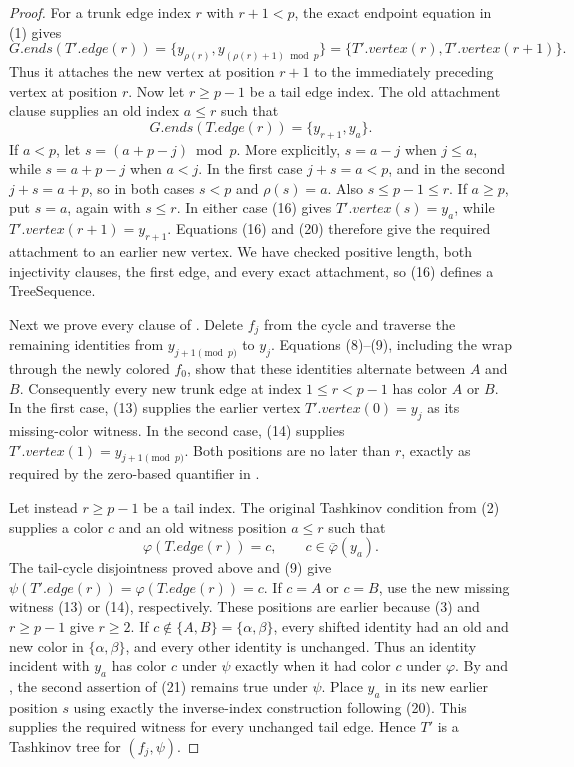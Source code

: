 \begin{proof}
For a trunk edge index $r$ with $r+1<p$, the exact endpoint equation in
(1) gives
\[
 G.ends(T'.edge(r))
   =\{y_{\rho(r)},y_{(\rho(r)+1)\bmod p}\}
   =\{T'.vertex(r),T'.vertex(r+1)\}.                             \tag{19}
\]
Thus it attaches the new vertex at position $r+1$ to the immediately
preceding vertex at position $r$.  Now let $r\geq p-1$ be a tail edge
index.  The old attachment clause supplies an old index $a\leq r$ such
that
\[
             G.ends(T.edge(r))=\{y_{r+1},y_a\}.                  \tag{20}
\]
If $a<p$, let $s=(a+p-j)\bmod p$.  More explicitly, $s=a-j$ when
$j\leq a$, while $s=a+p-j$ when $a<j$.  In the first case
$j+s=a<p$, and in the second $j+s=a+p$, so in both cases $s<p$ and
$\rho(s)=a$.  Also $s\leq p-1\leq r$.  If $a\geq p$, put $s=a$,
again with $s\leq r$.
In either case (16) gives $T'.vertex(s)=y_a$, while
$T'.vertex(r+1)=y_{r+1}$.  Equations (16) and (20) therefore give the
required attachment to an earlier new vertex.  We have checked positive
length, both injectivity clauses, the first edge, and every exact
attachment, so (16) defines a TreeSequence.

Next we prove every clause of .  Delete $f_j$ from
the cycle and traverse the remaining identities from $y_{j+1\pmod p}$
to $y_j$.  Equations (8)--(9), including the wrap through the newly
colored $f_0$, show that these identities alternate between $A$ and $B$.
Consequently every new trunk edge at index $1\leq r<p-1$ has color $A$
or $B$.  In the first case, (13) supplies the earlier vertex
$T'.vertex(0)=y_j$ as its missing-color witness.  In the second case,
(14) supplies $T'.vertex(1)=y_{j+1\pmod p}$.  Both positions are no later
than $r$, exactly as required by the zero-based quantifier in
.

Let instead $r\geq p-1$ be a tail index.  The original Tashkinov
condition from (2) supplies a color $c$ and an old witness position
$a\leq r$ such that
\[
       \varphi(T.edge(r))=c,\qquad c\in\overline\varphi(y_a).   \tag{21}
\]
The tail-cycle disjointness proved above and (9) give
$\psi(T'.edge(r))=\varphi(T.edge(r))=c$.  If $c=A$ or $c=B$, use the
new missing witness (13) or (14), respectively.  These positions are
earlier because (3) and $r\geq p-1$ give $r\geq2$.  If
$c\notin\{A,B\}=\{\alpha,\beta\}$, every shifted identity had an old and
new color in $\{\alpha,\beta\}$, and every other identity is unchanged.
Thus an identity incident with $y_a$ has color $c$ under $\psi$ exactly
when it had color $c$ under $\varphi$.  By
 and , the second assertion
of (21) remains true under $\psi$.  Place $y_a$ in its new earlier
position $s$ using exactly the inverse-index construction following
(20).  This supplies the required witness for every unchanged tail edge.
Hence $T'$ is a Tashkinov tree for $(f_j,\psi)$.


\end{proof}
